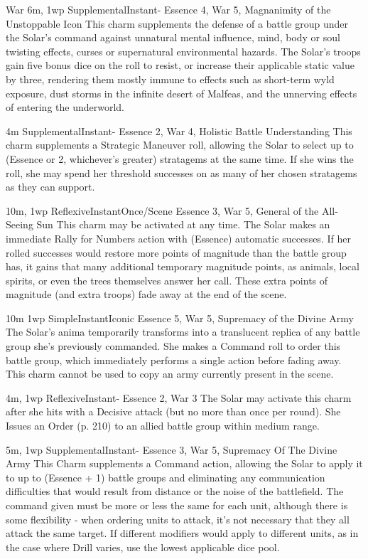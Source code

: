 \begin{Ability}{War}
  {6m, 1wp}
  {Supplemental}{Instant}{-}
  {Essence 4, War 5, Magnanimity of the Unstoppable Icon}
  This charm supplements the defense of a battle group under the Solar's command against unnatural mental influence, mind, body or soul twisting effects, curses or supernatural environmental hazards. The Solar's troops gain five bonus dice on the roll to resist, or increase their applicable static value by three, rendering them mostly immune to effects such as short-term wyld exposure, dust storms in the infinite desert of Malfeas, and the unnerving effects of entering the underworld.

  {4m}
  {Supplemental}{Instant}{-}
  {Essence 2, War 4, Holistic Battle Understanding}
  This charm supplements a Strategic Maneuver roll, allowing the Solar to select up to (Essence or 2, whichever's greater) stratagems at the same time. If she wins the roll, she may spend her threshold successes on as many of her chosen stratagems as they can support.

  {10m, 1wp}
  {Reflexive}{Instant}{Once/Scene}
  {Essence 3, War 5, General of the All-Seeing Sun}
  This charm may be activated at any time. The Solar makes an immediate Rally for Numbers action with (Essence) automatic successes. If her rolled successes would restore more points of magnitude than the battle group has, it gains that many additional temporary magnitude points, as animals, local spirits, or even the trees themselves answer her call. These extra points of magnitude (and extra troops) fade away at the end of the scene.

  {10m 1wp}
  {Simple}{Instant}{Iconic}
  {Essence 5, War 5, Supremacy of the Divine Army}
  The Solar's anima temporarily transforms into a translucent replica of any battle group she's previously commanded. She makes a Command roll to order this battle group, which immediately performs a single action before fading away. This charm cannot be used to copy an army currently present in the scene.

  {4m, 1wp}
  {Reflexive}{Instant}{-}
  {Essence 2, War 3}
  The Solar may activate this charm after she hits with a Decisive attack (but no more than once per round). She Issues an Order (p. 210) to an allied battle group within medium range.

  {5m, 1wp}
  {Supplemental}{Instant}{-}
  {Essence 3, War 5, Supremacy Of The Divine Army}
  This Charm supplements a Command action, allowing the Solar to apply it to up to (Essence + 1) battle groups and eliminating any communication difficulties that would result from distance or the noise of the battlefield. The command given must be more or less the same for each unit, although there is some flexibility - when ordering units to attack, it's not necessary that they all attack the same target. If different modifiers would apply to different units, as in the case where Drill varies, use the lowest applicable dice pool.

\end{Ability}
